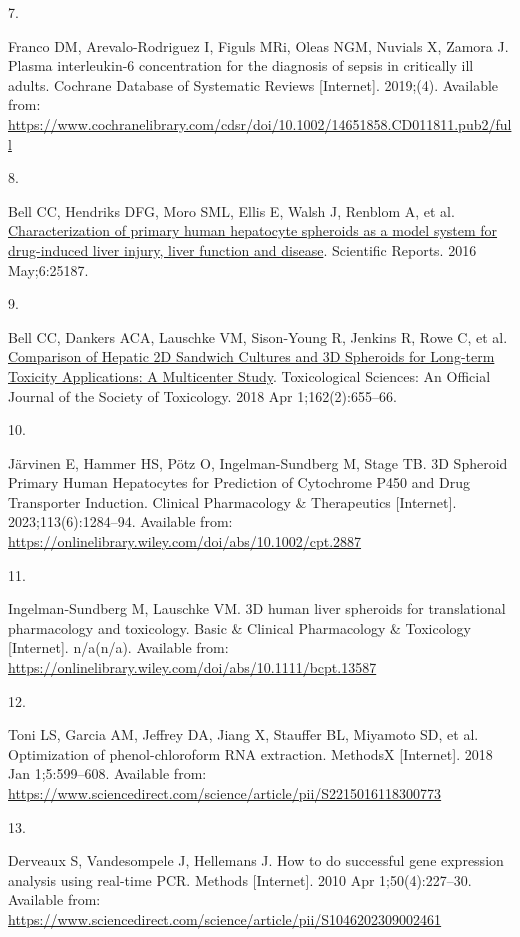 \documentclass[
  letterpaper,
  DIV=11,
  numbers=noendperiod,
  oneside]{scrartcl}
\newlength{\cslhangindent}
\newlength{\csllabelwidth}
\newenvironment{CSLReferences}[2] %
 {\begin{list}{}{%
  \setlength{\itemindent}{0pt}
  \setlength{\leftmargin}{0pt}
  \setlength{\parsep}{0pt}
  \ifodd #1
   \setlength{\leftmargin}{\cslhangindent}
   \setlength{\itemindent}{-1\cslhangindent}
  \fi
  \setlength{\itemsep}{#2\baselineskip}}}
 {\end{list}}
\newcommand{\CSLLeftMargin}[1]{\parbox[t]{\csllabelwidth}{\strut#1\strut}}
\newcommand{\CSLRightInline}[1]{\parbox[t]{\linewidth - \csllabelwidth}{\strut#1\strut}}
\begin{document}
\begin{CSLReferences}{0}{1}
\CSLLeftMargin{7. }%
\CSLRightInline{Franco DM, Arevalo-Rodriguez I, Figuls MRi, Oleas NGM,
Nuvials X, Zamora J. Plasma interleukin{-}6 concentration for the
diagnosis of sepsis in critically ill adults. Cochrane Database of
Systematic Reviews {[}Internet{]}. 2019;(4). Available from:
\url{https://www.cochranelibrary.com/cdsr/doi/10.1002/14651858.CD011811.pub2/full}}

\CSLLeftMargin{8. }%
\CSLRightInline{Bell CC, Hendriks DFG, Moro SML, Ellis E, Walsh J,
Renblom A, et al.
\href{https://doi.org/10.1038/srep25187}{Characterization of primary
human hepatocyte spheroids as a model system for drug-induced liver
injury, liver function and disease}. Scientific Reports. 2016
May;6:25187. }

\CSLLeftMargin{9. }%
\CSLRightInline{Bell CC, Dankers ACA, Lauschke VM, Sison-Young R,
Jenkins R, Rowe C, et al.
\href{https://doi.org/10.1093/toxsci/kfx289}{Comparison of Hepatic 2D
Sandwich Cultures and 3D Spheroids for Long-term Toxicity Applications:
A Multicenter Study}. Toxicological Sciences: An Official Journal of the
Society of Toxicology. 2018 Apr 1;162(2):655--66. }

\CSLLeftMargin{10. }%
\CSLRightInline{Järvinen E, Hammer HS, Pötz O, Ingelman-Sundberg M,
Stage TB. 3D Spheroid Primary Human Hepatocytes for Prediction of
Cytochrome P450 and Drug Transporter Induction. Clinical Pharmacology \&
Therapeutics {[}Internet{]}. 2023;113(6):1284--94. Available from:
\url{https://onlinelibrary.wiley.com/doi/abs/10.1002/cpt.2887}}

\CSLLeftMargin{11. }%
\CSLRightInline{Ingelman-Sundberg M, Lauschke VM. 3D human liver
spheroids for translational pharmacology and toxicology. Basic \&
Clinical Pharmacology \& Toxicology {[}Internet{]}. n/a(n/a). Available
from: \url{https://onlinelibrary.wiley.com/doi/abs/10.1111/bcpt.13587}}

\CSLLeftMargin{12. }%
\CSLRightInline{Toni LS, Garcia AM, Jeffrey DA, Jiang X, Stauffer BL,
Miyamoto SD, et al. Optimization of phenol-chloroform RNA extraction.
MethodsX {[}Internet{]}. 2018 Jan 1;5:599--608. Available from:
\url{https://www.sciencedirect.com/science/article/pii/S2215016118300773}}

\CSLLeftMargin{13. }%
\CSLRightInline{Derveaux S, Vandesompele J, Hellemans J. How to do
successful gene expression analysis using real-time PCR. Methods
{[}Internet{]}. 2010 Apr 1;50(4):227--30. Available from:
\url{https://www.sciencedirect.com/science/article/pii/S1046202309002461}}


\end{CSLReferences}
\end{document}
